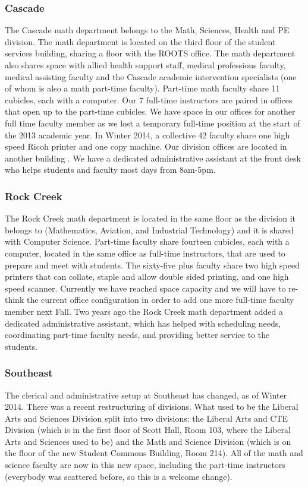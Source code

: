 \subsubsection{Cascade}
The Cascade math department belongs to the Math, Sciences, Health and PE
division. The math department is located on the third floor of the student
services building, sharing a floor with the ROOTS office. The math department
also shares space with allied health support staff, medical professions
faculty, medical assisting faculty and the Cascade academic intervention
specialists (one of whom is also a math part-time faculty).  Part-time math
faculty share 11 cubicles, each with a computer. Our 7 full-time instructors
are paired in offices that open up to the part-time cubicles. We have space in
our offices for another full time faculty member as we lost a temporary
full-time position at the start of the 2013 academic year. In Winter 2014, a
collective 42 faculty share one high speed Ricoh printer and one copy machine.
Our division offices are located in another building . We have a dedicated
administrative assistant at the front desk who helps students and faculty most
days from 8am-5pm. 

\subsubsection{Rock Creek}
The Rock Creek math department is located in the same floor as the division it
belongs to (Mathematics, Aviation, and Industrial Technology) and it is shared
with Computer Science.   Part-time faculty share fourteen cubicles, each with a
computer, located in the same office as full-time instructors, that are used to
prepare and meet with students. The sixty-five plus faculty share two high
speed printers that can collate, staple and allow double sided printing, and
one high speed scanner. Currently we have reached space capacity and we will
have to re-think the current office configuration in order to add one more
full-time faculty member next Fall.  Two years ago the Rock Creek math
department added a dedicated administrative assistant, which has helped with
scheduling needs, coordinating part-time faculty needs, and providing better
service to the students.  

\subsubsection{Southeast}
The clerical and administrative setup at Southeast has changed, as of Winter
2014. There was a recent restructuring of divisions. What used to be the
Liberal Arts and Sciences Division split into two divisions: the Liberal Arts
and CTE Division (which is in the first floor of Scott Hall, Room 103, where
the Liberal Arts and Sciences used to be) and the Math and Science Division
(which is on the  floor of the new Student Commons Building, Room 214).
All of the math and science faculty are now in this new space, including the
part-time instructors (everybody was scattered before, so this is a welcome
change).

